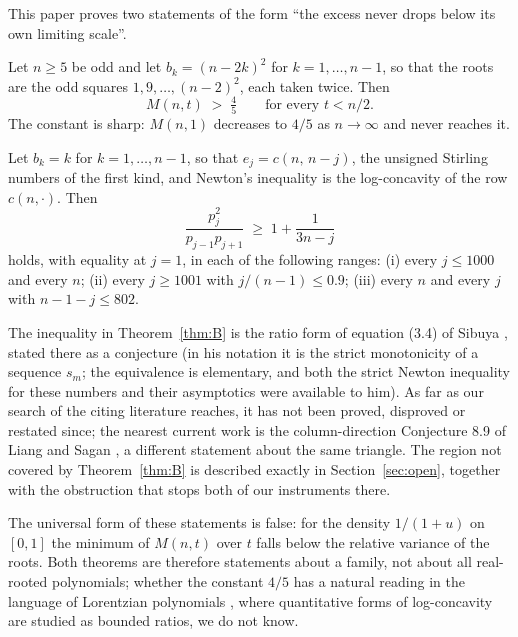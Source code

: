 \documentclass[12pt]{article}
\begin{document}
This paper proves two statements of the form ``the excess never drops below its own limiting scale''.

\begin{theorem}\label{thm:A}
Let $n\ge 5$ be odd and let $b_k = (n-2k)^2$ for $k = 1,\dots,n-1$, so that the roots are the odd squares $1, 9, \dots, (n-2)^2$, each taken twice. Then
\[
M(n,t) \;>\; \tfrac{4}{5} \qquad\text{for every } t < n/2 .
\]
The constant is sharp: $M(n,1)$ decreases to $4/5$ as $n\to\infty$ and never reaches it.
\end{theorem}

\begin{theorem}\label{thm:B}
Let $b_k = k$ for $k=1,\dots,n-1$, so that $e_j = c(n,\,n-j)$, the unsigned Stirling numbers of the first kind, and Newton's inequality is the log-concavity of the row $c(n,\cdot)$. Then
\[
\frac{p_j^2}{p_{j-1}p_{j+1}} \;\ge\; 1 + \frac{1}{3n-j}
\]
holds, with equality at $j=1$, in each of the following ranges: (i) every $j\le 1000$ and every $n$; (ii) every $j\ge 1001$ with $j/(n-1)\le 0.9$; (iii) every $n$ and every $j$ with $n-1-j \le 802$.
\end{theorem}

The inequality in Theorem~\ref{thm:B} is the ratio form of equation (3.4) of Sibuya \cite{Sibuya1988}, stated there as a conjecture (in his notation it is the strict monotonicity of a sequence $s_m$; the equivalence is elementary, and both the strict Newton inequality for these numbers \cite{Lieb1968} and their asymptotics \cite{Hwang1995} were available to him). As far as our search of the citing literature reaches, it has not been proved, disproved or restated since; the nearest current work is the column-direction Conjecture 8.9 of Liang and Sagan \cite{LiangSagan2024}, a different statement about the same triangle. The region not covered by Theorem~\ref{thm:B} is described exactly in Section~\ref{sec:open}, together with the obstruction that stops both of our instruments there.

The universal form of these statements is false: for the density $1/(1+u)$ on $[0,1]$ the minimum of $M(n,t)$ over $t$ falls below the relative variance of the roots. Both theorems are therefore statements about a family, not about all real-rooted polynomials; whether the constant $4/5$ has a natural reading in the language of Lorentzian polynomials \cite{BrandenHuh2020}, where quantitative forms of log-concavity are studied as bounded ratios, we do not know.
\end{document}

